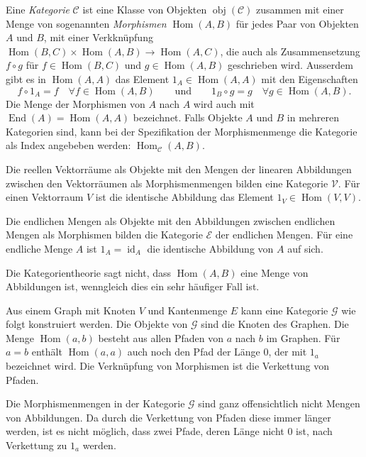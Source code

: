 \begin{definition}
Eine {\em Kategorie} $\mathscr{C}$ ist eine Klasse von Objekten
$\operatorname{obj}(\mathscr{C})$ zusammen mit einer
Menge von sogenannten {\em Morphismen} $\operatorname{Hom}(A,B)$ für
jedes Paar von Objekten $A$ und $B$, mit einer Verkknüpfung
$
\operatorname{Hom}(B,C)\times \operatorname{Hom}(A,B)
\to
\operatorname{Hom}(A,C)
$, die auch als Zusammensetzung $f\circ g$ für $f\in \operatorname{Hom}(B,C)$
und $g\in \operatorname{Hom}(A,B)$ geschrieben wird.
Ausserdem gibt es in $\operatorname{Hom}(A,A)$ das Element
$1_A\in\operatorname{Hom}(A,A)$ mit den Eigenschaften
\[
f\circ 1_A = f\quad\forall f\in \operatorname{Hom}(A,B)
\qquad\text{und}\qquad
1_B\circ g = g\quad\forall g\in\operatorname{Hom}(A,B).
\]
Die Menge der Morphismen von $A$ nach $A$ wird auch mit
$\operatorname{End}(A)=\operatorname{Hom}(A,A)$ bezeichnet.
Falls Objekte $A$ und $B$ in mehreren Kategorien sind, kann bei der
Spezifikation der Morphismenmenge die Kategorie als Index
angebeben werden: $\operatorname{Hom}_{\mathscr{C}}(A,B)$.
\end{definition}

\begin{beispiel}
Die reellen Vektorräume als Objekte mit den Mengen der linearen
Abbildungen zwischen den Vektorräumen als Morphismenmengen bilden
eine Kategorie $\mathscr{V}$.
Für einen Vektorraum $V$ ist die identische Abbildung das Element
$1_V\in\operatorname{Hom}(V,V)$.
\end{beispiel}

\begin{beispiel}
Die endlichen Mengen als Objekte mit den Abbildungen zwischen
endlichen Mengen als Morphismen bilden die Kategorie $\mathscr{E}$
der endlichen Mengen.
Für eine endliche Menge $A$ ist $1_A=\operatorname{id}_A$ die
identische Abbildung von $A$ auf sich.
\end{beispiel}

Die Kategorientheorie sagt nicht, dass $\operatorname{Hom}(A,B)$
eine Menge von Abbildungen ist, wenngleich dies ein sehr häufiger
Fall ist.

\begin{beispiel}
Aus einem Graph mit Knoten $V$ und Kantenmenge $E$ kann eine Kategorie
$\mathscr{G}$ wie folgt konstruiert werden.
Die Objekte von $\mathscr{G}$ sind die Knoten des Graphen.
Die Menge $\operatorname{Hom}(a,b)$ besteht aus allen Pfaden
von $a$ nach $b$ im Graphen.
Für $a=b$ enthält $\operatorname{Hom}(a,a)$ auch noch den Pfad der
Länge $0$, der mit $1_a$ bezeichnet wird.
Die Verknüpfung von Morphismen ist die Verkettung von Pfaden.

Die Morphismenmengen in der Kategorie $\mathscr{G}$ sind ganz offensichtlich
nicht Mengen von Abbildungen.
Da durch die Verkettung von Pfaden diese immer länger werden, ist es
nicht möglich, dass zwei Pfade, deren Länge nicht $0$ ist, nach
Verkettung zu $1_a$ werden.
\end{beispiel}


